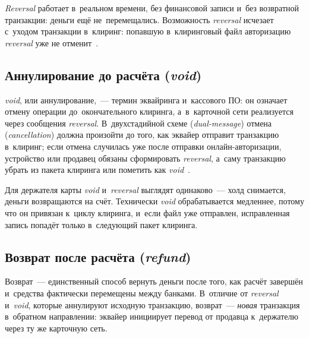 \textit{Reversal} работает в~реальном времени, без финансовой записи и~без возвратной
транзакции: деньги ещё не~перемещались. Возможность \textit{reversal} исчезает с~уходом
транзакции в~клиринг: попавшую в~клиринговый файл авторизацию \textit{reversal}
уже не отменит~\cite{mc-rules}.

\subsection*{Аннулирование до расчёта (\textit{void})}

\textit{void}, или аннулирование,~--- термин эквайринга и~кассового ПО:
он означает отмену операции до~окончательного клиринга, а~в~карточной сети
реализуется через сообщения \textit{reversal}. В~двухстадийной схеме (\textit{dual-message}) отмена (\textit{cancellation})
должна произойти до того, как эквайер отправит транзакцию в~клиринг; если
отмена случилась уже после отправки онлайн-авторизации, устройство или продавец
обязаны сформировать \textit{reversal}, а~саму транзакцию убрать из пакета клиринга или
пометить как \textit{void}~\cite{visa-tadg}.

Для держателя карты \textit{void} и~\textit{reversal} выглядят одинаково~--- холд
снимается, деньги возвращаются на счёт. Технически \textit{void}
обрабатывается медленнее, потому что он привязан к~циклу клиринга, и~если файл
уже отправлен, исправленная запись попадёт только в~следующий пакет клиринга.


\subsection*{Возврат после расчёта (\textit{refund})}

Возврат~--- единственный способ вернуть деньги после того, как расчёт завершён
и~средства фактически перемещены между банками. В~отличие от \textit{reversal}
и~\textit{void}, которые аннулируют исходную транзакцию, возврат~---
\emph{новая} транзакция в~обратном направлении: эквайер инициирует перевод от
продавца к~держателю через ту же карточную сеть.

